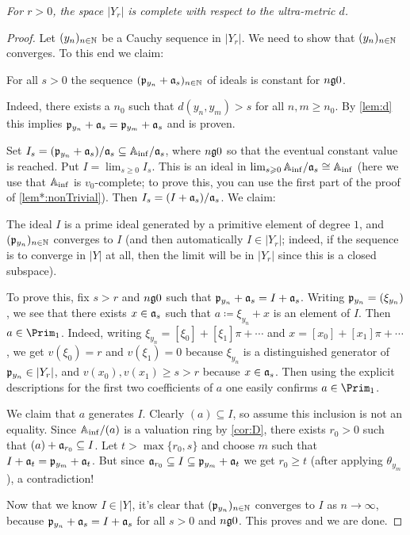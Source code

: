 \documentclass[a4paper, 10pt, oneside, DIV=9, chapterprefix=true, numbers=enddot,bibliography=totoc]{scrbook}
\DeclareRobustCommand{\Attention}{\tikz[baseline, anchor=base]\node[draw, regular polygon, regular polygon sides=3, rounded corners=2, thick, inner sep=-0.25pt] at (0,0) {\textbf{!}};}
\begin{document}
\numpar{Proposition \smash{\Attention}}\label{prop:YrComplete}
\itshape For $r>0$, the space $|Y_r|$ is complete with respect to the ultra-metric $d$.\upshape
\begin{proof}
	Let $(y_n)_{n\in\IN}$ be a Cauchy sequence in $|Y_r|$. We need to show that $(y_n)_{n\in\IN}$ converges. To this end we claim:
	\begin{alphanumerate}
		\item[\itememph{*}] For all $s>0$ the sequence $(\pp_{y_n}+\aa_s)_{n\in\IN}$ of ideals is constant for $n\gge 0$.
	\end{alphanumerate}
	Indeed, there exists a $n_0$ such that $d(y_n,y_m)>s$ for all $n,m\geq n_0$. By \cref{lem:d} this implies $\pp_{y_n}+\aa_{s}=\pp_{y_m}+\aa_{s}$ and \itememph{*} is proven.
	
	Set $I_s=(\pp_{y_n}+\aa_s)/\aa_s\subseteq \IA_\inf/\aa_s$, where $n\gge 0$ so that the eventual constant value is reached. Put $I=\lim_{s\geq 0}I_s$. This is an ideal in $\lim_{s\geq 0}\IA_\inf/\aa_s\cong \IA_\inf$ (here we use that $\IA_\inf$ is $v_0$-complete; to prove this, you can use the first part of the proof of \cref{lem*:nonTrivial}). Then $I_s=(I+\aa_s)/\aa_s$. We claim:
	\begin{alphanumerate}
		\item[\itememph{\boxtimes}] The ideal $I$ is a prime ideal generated by a primitive element of degree $1$, and $(\pp_{y_n})_{n\in\IN}$ converges to $I$ (and then automatically $I\in |Y_r|$; indeed, if the sequence is to converge in $|Y|$ at all, then the limit will be in $|Y_r|$ since this is  a closed subspace).
	\end{alphanumerate}
	To prove this, fix $s>r$ and $n\gge 0$ such that $\pp_{y_n}+\aa_s=I+\aa_s$. Writing $\pp_{y_n}=(\xi_{y_n})$, we see that there exists $x\in\aa_s$ such that $a\coloneqq \xi_{y_n}+x$ is an element of $I$. Then $a\in\Prim_1$. Indeed, writing $\xi_{y_n}=[\xi_0]+[\xi_1]\pi+\dotsb$ and $x=[x_0]+[x_1]\pi+\dotsb$, we get $v(\xi_0)=r$ and $v(\xi_1)=0$ because $\xi_{y_n}$ is a distinguished generator of $\pp_{y_n}\in|Y_r|$, and $v(x_0),v(x_1)\geq s> r$ because $x\in\aa_s$. Then using the explicit descriptions for the first two coefficients of $a$ one easily confirms $a\in\Prim_1$.
	
	We claim that $a$ generates $I$. Clearly $(a)\subseteq I$, so assume this inclusion is not an equality. Since $\IA_\inf/(a)$ is a valuation ring by \cref{cor:D}, there exists $r_0>0$ such that $(a)+\aa_{r_0}\subseteq I$. Let $t>\max\{r_0,s\}$ and choose $m$ such that $I+\aa_t=\pp_{y_m}+\aa_t$. But since $\aa_{r_0}\subseteq I\subseteq \pp_{y_m}+\aa_t$ we get $r_0\geq t$ (after applying $\theta_{y_m}$), a contradiction!
	
	Now that we know $I\in|Y|$, it's clear that $(\pp_{y_n})_{n\in\IN}$ converges to $I$ as $n\to \infty$, because $\pp_{y_n}+\aa_s=I+\aa_s$ for all $s>0$ and $n\gge 0$. This proves \itememph{\boxtimes} and we are done.
\end{proof}
\end{document}
